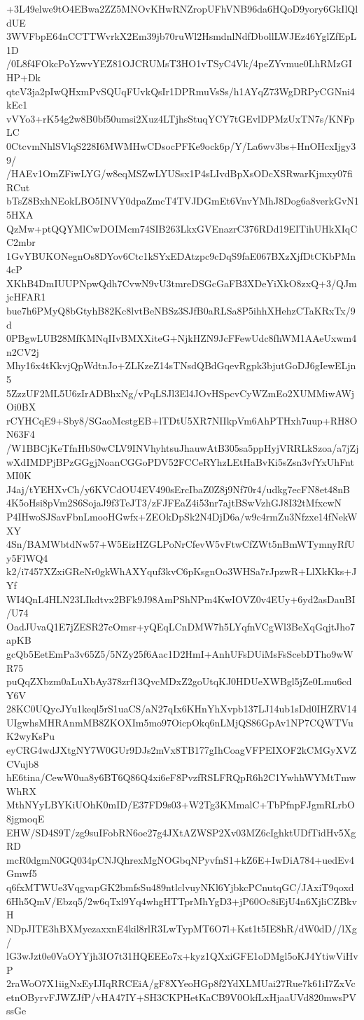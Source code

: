 +3L49elwe9tO4EBwa2ZZ5MNOvKHwRNZropUFhVNB96da6HQoD9yory6GkIlQldUE
3WVFbpE64nCCTTWvrkX2Em39jb70ruWl2HsmdnlNdfDbollLWJEz46YglZfEpL1D
/0L8f4FOkcPoYzwvYEZ81OJCRUMsT3HO1vTSyC4Vk/4peZYvmue0LhRMzGIHP+Dk
qtcV3ja2pIwQHxmPvSQUqFUvkQsIr1DPRmuVsSs/h1AYqZ73WgDRPyCGNni4kEc1
vVYo3+rK54g2w8B0bf50umsi2Xuz4LTjhsStuqYCY7tGEvlDPMzUxTN7s/KNFpLC
0CtcvmNhlSVlqS228I6MWMHwCDsocPFKe9ock6p/Y/La6wv3bs+HnOHcxIjgy39/
/HAEv1OmZFiwLYG/w8eqMSZwLYUSsx1P4sLIvdBpXsODcXSRwarKjmxy07fiRCut
bTsZ8BxhNEokLBO5INVY0dpaZmcT4TVJDGmEt6VnvYMhJ8Dog6a8verkGvN15HXA
QzMw+ptQQYMlCwDOIMcm74SIB263LkxGVEnazrC376RDd19EITihUHkXIqCC2mbr
1GvYBUKONegnOs8DYov6Ctc1kSYxEDAtzpc9cDqS9faE067BXzXjfDtCKbPMn4cP
XKhB4DmIUUPNpwQdh7CvwN9vU3tmreDSGcGaFB3XDeYiXkO8zxQ+3/QJmjcHFAR1
bue7h6PMyQ8bGtyhB82Kc8lvtBeNBSz3SJfB0aRLSa8P5ihhXHehzCTaKRxTx/9d
0PBgwLUB28MfKMNqIIvBMXXiteG+NjkHZN9JcFFewUdc8fhWM1AAeUxwm4n2CV2j
Mhy16x4tKkvjQpWdtnJo+ZLKzeZ14sTNsdQBdGqevRgpk3bjutGoDJ6gIewELjn5
5ZzzUF2ML5U6zIrADBhxNg/vPqLSJl3El4JOvHSpcvCyWZmEo2XUMMiwAWjOi0BX
rCYHCqE9+Sby8/SGaoMcstgEB+lTDtU5XR7NIIkpVm6AhPTHxh7uup+RH8ON63F4
/W1BBCjKeTfnHbS0wCLV9INVhyhtsuJhauwAtB305sa5ppHyjVRRLkSzoa/a7jZj
wXdIMDPjBPzGGgjNoanCGGoPDV52FCCeRYhzLEtHaBvKi5sZsn3vfYxUhFntMI0K
J4aj/tYEHXvCh/y6KVCdOU4EV490sErcIbaZ0Z8j9Nf70r4/udkg7ecFN8et48nB
4K5oHsi8pVm2S6SojaJ9f3TeJT3/zFJFEaZ4i53nr7ajtBSwVzhGJ8I32tMfxcwN
P4IHwoSJSavFbnLmooHGwfx+ZEOkDpSk2N4DjD6a/w9c4rmZu3Nfzxe14fNekWXY
4Sn/BAMWbtdNw57+W5EizHZGLPoNrCfevW5vFtwCfZWt5nBmWTymnyRfUy5FlWQ4
k2/i7457XZxiGReNr0gkWhAXYquf3kvC6pKsgnOo3WHSa7rJpzwR+LlXkKks+JYf
WI4QnL4HLN23LIkdtvx2BFk9J98AmPShNPm4KwIOVZ0v4EUy+6yd2asDauBI/U74
OadJUvaQ1E7jZESR27cOmsr+yQEqLCnDMW7h5LYqfnVCgWl3BeXqGqjtJho7apKB
gcQb5EetEmPa3v65Z5/5NZy25f6Aac1D2HmI+AnhUFsDUiMsFsScebDTho9wWR75
puQqZXbzm0aLuXbAy378zrf13QvcMDxZ2goUtqKJ0HDUeXWBgl5jZe0Lmu6cdY6V
28KC0UQycJYu1keql5rS1uaCS/aN27qIx6KHnYhXvpb137LJ14ub1sDd0IHZRV14
UIgwhsMHRAnmMB8ZKOXIm5mo97OicpOkq6nLMjQS86GpAv1NP7CQWTVuK2wyKsPu
eyCRG4wdJXtgNY7W0GUr9DJs2mVx8TB177gIhCoagVFPEIXOF2kCMGyXVZCVujb8
hE6tina/CewW0ua8y6BT6Q86Q4xi6eF8PvzfRSLFRQpR6h2C1YwhhWYMtTmwWhRX
MthNYyLBYKiUOhK0mID/E37FD9s03+W2Tg3KMmalC+TbPfnpFJgmRLrbO8jgmoqE
EHW/SD4S9T/zg9suIFobRN6oe27g4JXtAZWSP2Xv03MZ6cIghktUDfTidHv5XgRD
mcR0dgmN0GQ034pCNJQhrexMgNOGbqNPyvfnS1+kZ6E+IwDiA784+uedEv4Gmwf5
q6fxMTWUe3VqgvapGK2bmfsSu489ntlclvuyNKl6YjbkcPCnutqGC/JAxiT9qoxd
6Hh5QmV/Ebzq5/2w6qTxl9Yq4whgHTTprMhYgD3+jP60Oc8iEjU4n6XjliCZBkvH
NDpJITE3hBXMyezaxxnE4kil8rlR3LwTypMT6O7l+Kst1t5IE8hR/dW0dD//lXg/
lG3wJzt0e0VaOYYjh3IO7t31HQEEEo7x+kyz1QXxiGFE1oDMgl5oKJ4YtiwViHvP
2raWoO7X1iigNxEyIJIqRRCEiA/gF8XYeoHGp8f2YdXLMUai27Rue7k61iI7ZxVc
etnOByrvFJWZJfP/vHA47IY+SH3CKPHetKaCB9V0OkfLxHjaaUVd820mwsPVssGe

